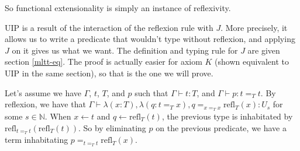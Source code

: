 So functional extensionality is simply an instance of reflexivity.

UIP is a result of the interaction of the reflexion rule with $J$. More
precisely, it allows us to write a predicate that wouldn't type without
reflexion, and applying $J$ on it gives us what we want. The definition and
typing rule for $J$ are given section \ref{mltt-eq}. The proof is actually
easier for axiom $K$ (shown equivalent to UIP in the same section), so that is
the one we will prove.

Let's assume we have $\Gamma$, $t$, $T$, and $p$ such that $\Gamma\vdash t:T$,
and $\Gamma\vdash p : t =_T t$. By reflexion, we have that $\Gamma\vdash
\lambda(x:T),\lambda(q : t =_T x), q =_{x =_T x} \text{refl}_T(x) : U_s$ for
some $s\in\mathbb{N}$. When $x \leftarrow t$ and $q \leftarrow
\text{refl}_T(t)$, the previous type is inhabitated by $\text{refl}_{t=_T
t}(\text{refl}_T(t))$. So by eliminating $p$ on the previous predicate, we have
a term inhabitating $p =_{t =_T t} \text{refl}_T(x)$.

